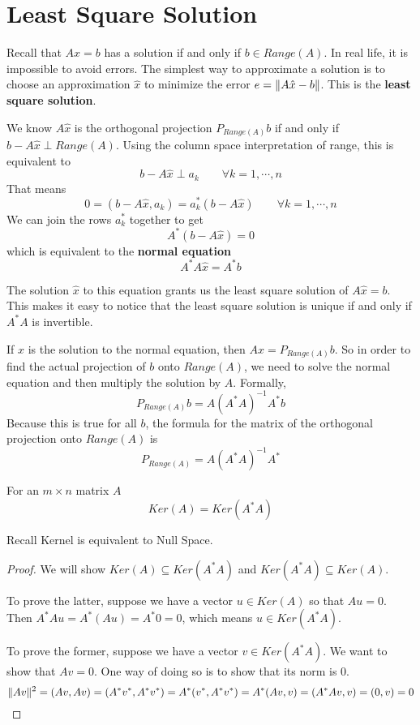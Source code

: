 \section{Least Square Solution} 
Recall that $Ax = b$ has a solution if and only if $b \in Range(A)$. In real life, it is impossible to avoid errors. The simplest way to approximate a solution is to choose an approximation $\hat{x}$ to minimize the error $e = \lVert A \hat{x} - b\rVert$. This is the \textbf{least square solution}. 

We know $A \hat{x}$ is the orthogonal projection $P_{Range(A)} b$ if and only if $b - A \hat{x} \perp Range(A)$. Using the column space interpretation of range, this is equivalent to 
$$b - A \hat{x} \perp a_{k} \qquad \forall k = 1, \cdots, n$$
That means 
$$0 = (b - A \hat{x}, a_{k}) = a^{*}_{k} (b - A \hat{x}) \qquad \forall k = 1, \cdots, n$$ 
We can join the rows $a^{*}_{k}$ together to get
$$A^{*} (b - A \hat{x}) = 0$$
which is equivalent to the \textbf{normal equation} 
$$A^{*} A \hat{x} = A^{*} b$$

The solution $\hat{x}$ to this equation grants us the least square solution of $A \hat{x} = b$. This makes it easy to notice that the least square solution is unique if and only if $A^{*} A$ is invertible. 

If $\hat{x}$ is the solution to the normal equation, then $A \hat{x} = P_{Range(A)} b$. So in order to find the actual projection of $b$ onto $Range(A)$, we need to solve the normal equation and then multiply the solution by $A$. Formally, 
$$P_{Range(A)} b = A (A^{*} A)^{-1} A^{*} b$$
Because this is true for all $b$, the formula for the matrix of the orthogonal projection onto $Range(A)$ is 
$$P_{Range(A)} = A (A^{*} A)^{-1} A^{*}$$

\begin{theorem}
For an $m \times n$ matrix $A$ 
$$Ker(A) = Ker(A^{*}A)$$

Recall Kernel is equivalent to Null Space.
\end{theorem}

\begin{proof}
We will show $Ker(A) \subseteq Ker(A^{*} A)$ and $Ker(A^{*} A) \subseteq Ker(A)$. 

To prove the latter, suppose we have a vector $u \in Ker(A)$ so that $Au = 0$. Then $A^{*} A u = A^{*} (Au) = A^{*} 0 = 0$, which means $u \in Ker(A^{*} A)$. 

To prove the former, suppose we have a vector $v \in Ker(A^{*} A)$. We want to show that $Av = 0$. One way of doing so is to show that its norm is 0. 
$$\lVert Av\rVert^{2} = (Av, Av) = (A^{*} v^{*}, A^{*} v^{*}) = A^{*} (v^{*}, A^{*} v^{*}) = A^{*} (Av, v) = (A^{*} Av, v) = (0, v) = 0$$
\end{proof}

